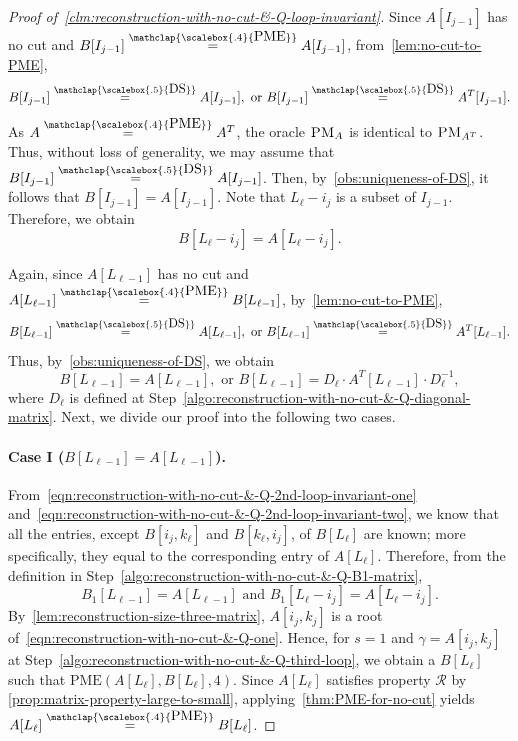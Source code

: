 \documentclass[11pt,letterpaper]{article}
\newcommand{\DS}{\stackrel{\mathclap{\scalebox{.5}{\mbox{DS}}}}{=}}
\newcommand{\PME}{\stackrel{\mathclap{\scalebox{.4}{\mbox{PME}}}}{=}}
\newcommand{\kPME}[3]{\mathrm{PME}(#1, #2, #3)}
\newcommand{\prop}{\mathcal{R}}
\newcommand{\PMoracle}[1]{\textsc{PM}_{#1}}
\begin{document}
{{{\begin{proof}[Proof of~\cref{clm:reconstruction-with-no-cut-&-Q-loop-invariant}]
Since $A[I_{j-1}]$ has no cut and $B[I_{j-1}]\PME A[I_{j-1}]$, from~\cref{lem:no-cut-to-PME}, $$B[I_{j-1}]\DS A[I_{j-1}], \text{ or } B[I_{j-1}]\DS A^T[I_{j-1}].$$ As $A\PME A^T$, the oracle $\PMoracle{A}$ is identical to $\PMoracle{A^T}$. Thus, without loss of generality, we may assume that $B[I_{j-1}]\DS A[I_{j-1}]$. Then, by~\cref{obs:uniqueness-of-DS}, it follows that $B[I_{j-1}]=A[I_{j-1}]$. Note that $L_\ell-i_j$ is a subset of $I_{j-1}$. Therefore, we obtain 
\begin{equation}
\label{eqn:reconstruction-with-no-cut-&-Q-2nd-loop-invariant-one}
B[L_\ell-i_j]=A[L_\ell-i_j].
\end{equation}

Again, since $A[L_{\ell-1}]$ has no cut and $A[L_{\ell-1}]\PME B[L_{\ell-1}]$, by~\cref{lem:no-cut-to-PME}, $$B[L_{\ell-1}]\DS A[L_{\ell-1}], \text{ or } B[L_{\ell-1}]\DS A^T[L_{\ell-1}].$$ Thus, by~\cref{obs:uniqueness-of-DS}, we obtain
\begin{equation}
\label{eqn:reconstruction-with-no-cut-&-Q-2nd-loop-invariant-two}
B[L_{\ell-1}]=A[L_{\ell-1}], \text{ or } B[L_{\ell-1}]=D_\ell\cdot A^T[L_{\ell-1}]\cdot D_{\ell}^{-1},
\end{equation}
where $D_\ell$ is defined at Step~\ref{algo:reconstruction-with-no-cut-&-Q-diagonal-matrix}. Next, we divide our proof into the following two cases.

\paragraph*{Case I ($B[L_{\ell-1}]=A[L_{\ell-1}]$).} From~\cref{eqn:reconstruction-with-no-cut-&-Q-2nd-loop-invariant-one} and~\cref{eqn:reconstruction-with-no-cut-&-Q-2nd-loop-invariant-two}, we know that all the entries, except $B[i_j, k_\ell]$ and $B[k_\ell, i_j]$,  of $B[L_\ell]$ are known; more specifically, they equal to the corresponding entry of $A[L_\ell]$. Therefore, from the definition in Step~\ref{algo:reconstruction-with-no-cut-&-Q-B1-matrix}, $$B_1[L_{\ell-1}]=A[L_{\ell-1}] \text{ and } B_1[L_{\ell}-i_j]=A[L_{\ell}-i_j].$$ By~\cref{lem:reconstruction-size-three-matrix}, $A[i_j, k_j]$ is a root of~\cref{eqn:reconstruction-with-no-cut-&-Q-one}. Hence, for $s=1$ and $\gamma=A[i_j, k_j]$ at Step~\ref{algo:reconstruction-with-no-cut-&-Q-third-loop}, we obtain a $B[L_\ell]$ such that $\kPME{A[L_\ell]}{B[L_\ell]}{4}$. Since $A[L_\ell]$ satisfies property $\prop$ by \cref{prop:matrix-property-large-to-small}, applying~\cref{thm:PME-for-no-cut} yields $A[L_\ell]\PME B[L_\ell]$.


\end{proof}}}}
\end{document}
